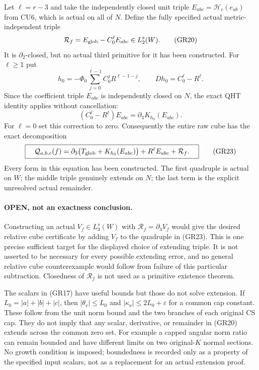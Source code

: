 Let $\ell=r-3$ and take the independently closed unit triple
$E_{abc}=\mathcal H_c(e_{ab})$ from CU6, which is actual on all of
$N$.  Define the fully specified actual metric-independent triple
\[
                  \mathcal R_f=E_{\rm glob}-C_0^\ell E_{abc}
                                           \in L_2^s(W).
 \tag{GR20}
\]
It is $\partial_2$-closed, but no actual third primitive for it
has been constructed.  For $\ell\ge1$ put
\[
 h_0=-\Phi_0\sum_{j=0}^{\ell-1}C_0^jR^{\ell-1-j},
                \qquad Dh_0=C_0^\ell-R^\ell.
 \tag{GR21}
\]
Since the coefficient triple $E_{abc}$ is independently closed
on $N$, the exact QHT identity applies without cancellation:
\[
 (C_0^\ell-R^\ell)E_{abc}
                         =\partial_3K_{h_0}(E_{abc}).
 \tag{GR22}
\]
For $\ell=0$ set this correction to zero.  Consequently the
entire raw cube has the exact decomposition
\[
 \boxed{\quad
 \mathcal Q_{a,b,c}(f)
  =\partial_3\bigl(T_{\rm glob}+K_{h_0}(E_{abc})\bigr)
                         +R^\ell E_{abc}+\mathcal R_f.
 \quad}
 \tag{GR23}
\]
Every form in this equation has been constructed.  The first
quadruple is actual on $W$; the middle triple genuinely extends
on $N$; the last term is the explicit unresolved actual remainder.

\paragraph{OPEN, not an exactness conclusion.}
Constructing an actual $V_f\in L_3^s(W)$ with
$\mathcal R_f=\partial_3V_f$ would give the desired relative
cube certificate by adding $V_f$ to the quadruple in (GR23).
This is one precise sufficient target for the displayed choice
of extending triple.  It is not asserted to be necessary for
every possible extending error, and no general relative cube
counterexample would follow from failure of this particular
subtraction.  Closedness of $\mathcal R_f$ is not used as a
primitive existence theorem.

The scalars in (GR17) have useful bounds but those do not solve
extension.  If $L_0=|a|+|b|+|c|$, then
$|\theta_v|\le L_0$ and $|\kappa_\nu|\le2L_0+\varepsilon$
for a common cap constant.  These follow from the unit norm
bound and the two branches of each original CS cap.  They do
not imply that any scalar, derivative, or remainder in (GR20)
extends across the common zero set.  For example a capped angular
norm ratio can remain bounded and have different limits on two
original-$K$ normal sections.  No growth condition is imposed;
boundedness is recorded only as a property of the specified
input scalars, not as a replacement for an actual extension proof.

